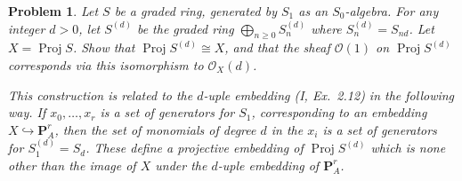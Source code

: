 \documentclass[12pt,letterpaper]{article}
\newtheorem{problem}{Problem}[section]
\theoremstyle{definition}
\theoremstyle{remark}
\numberwithin{equation}{section}
\numberwithin{figure}{problem}
\DeclareMathOperator{\Proj}{Proj}
\newcommand{\OO}{\mathcal{O}}
\begin{document}
\begin{problem}
  Let $S$ be a graded ring, generated by $S_1$ as an $S_0$-algebra. For any integer $d > 0$, let $S^{(d)}$ be the graded ring $\bigoplus_{n \ge 0} S_n^{(d)}$ where $S_n^{(d)} = S_{nd}$. Let $X = \Proj S$. Show that $\Proj S^{(d)} \cong X$, and that the sheaf $\OO(1)$ on $\Proj S^{(d)}$ corresponds via this isomorphism to $\OO_X(d)$.
  \par This construction is related to the $d$-uple \emph{embedding (I, Ex.~2.12)} in the following way. If $x_0,\ldots,x_r$ is a set of generators for $S_1$, corresponding to an embedding $X \hookrightarrow \mathbf{P}^r_A$, then the set of monomials of degree $d$ in the $x_i$ is a set of generators for $S_1^{(d)} = S_d$. These define a projective embedding of $\Proj S^{(d)}$ which is none other than the image of $X$ under the $d$-uple embedding of $\mathbf{P}^r_A$.
\end{problem}
\end{document}

